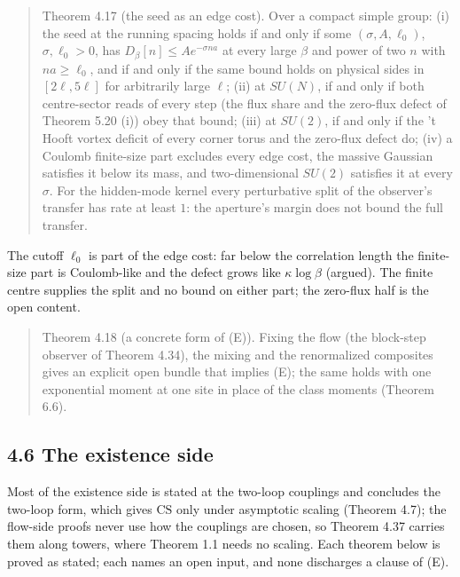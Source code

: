 \documentclass[10pt,letterpaper,twocolumn]{article}
\begin{document}
\begin{quote}
Theorem 4.17 (the seed as an edge cost). Over a compact simple group: (i) the seed at the running spacing holds if and only if some \((\sigma,A,\ell_0)\), \(\sigma,\ell_0>0\), has \(D_\beta[n]\le Ae^{-\sigma na}\) at every large \(\beta\) and power of two \(n\) with \(na\ge\ell_0\), and if and only if the same bound holds on physical sides in \([2\ell,5\ell]\) for arbitrarily large \(\ell\); (ii) at \(SU(N)\), if and only if both centre-sector reads of every step (the flux share and the zero-flux defect of Theorem 5.20 (i)) obey that bound; (iii) at \(SU(2)\), if and only if the 't Hooft vortex deficit of every corner torus and the zero-flux defect do; (iv) a Coulomb finite-size part excludes every edge cost, the massive Gaussian satisfies it below its mass, and two-dimensional \(SU(2)\) satisfies it at every \(\sigma\). For the hidden-mode kernel every perturbative split of the observer's transfer has rate at least \(1\): the aperture's margin does not bound the full transfer.
\end{quote}

The cutoff \(\ell_0\) is part of the edge cost: far below the correlation length the finite-size part is Coulomb-like and the defect grows like \(\kappa\log\beta\) (argued). The finite centre supplies the split and no bound on either part; the zero-flux half is the open content.

\begin{quote}
Theorem 4.18 (a concrete form of (E)). Fixing the flow (the block-step observer of Theorem 4.34), the mixing and the renormalized composites gives an explicit open bundle that implies (E); the same holds with one exponential moment at one site in place of the class moments (Theorem 6.6).
\end{quote}

\subsection{4.6 The existence side}\label{46-the-existence-side}

Most of the existence side is stated at the two-loop couplings and concludes the two-loop form, which gives \(\mathrm{CS}\) only under asymptotic scaling (Theorem 4.7); the flow-side proofs never use how the couplings are chosen, so Theorem 4.37 carries them along towers, where Theorem 1.1 needs no scaling. Each theorem below is proved as stated; each names an open input, and none discharges a clause of (E).
\end{document}
